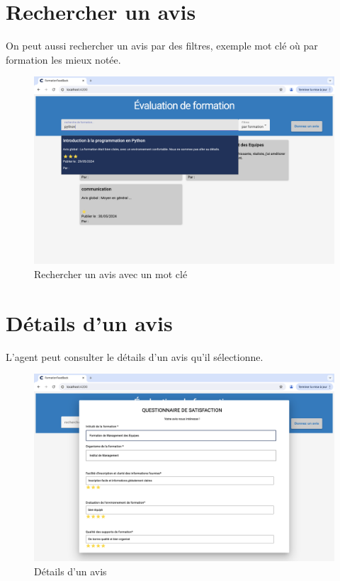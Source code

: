 \newpage

\section*{Rechercher un avis}
On peut aussi rechercher un avis par des filtres, exemple mot clé où par formation les mieux notée.
\medskip

\begin{figure}[h!]
    \centering
    \includegraphics[width=1\textwidth]{images/fenetres/rechercheAvis.png}
    \caption{Rechercher un avis avec un mot clé}
\end{figure}

\newpage

\section*{Détails d'un avis}
L'agent peut consulter le détails d'un avis qu'il sélectionne.
\medskip

\begin{figure}[h!]
    \centering
    \includegraphics[width=1\textwidth]{images/fenetres/DetailsAvis.png}
    \caption{Détails d'un avis}
\end{figure}
\medskip